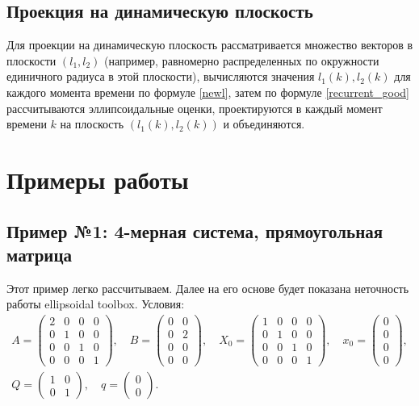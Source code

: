 \documentclass[10pt, a4paper]{article}
\begin{document}
\subsection{Проекция на динамическую плоскость}
Для проекции на динамическую плоскость рассматривается множество векторов в плоскости $(l_1,l_2)$ (например, равномерно распределенных по окружности единичного радиуса в этой плоскости), вычисляются значения $l_1(k), l_2(k)$ для каждого момента времени по формуле \eqref{newl}, затем по формуле \eqref{recurrent_good} рассчитываются эллипсоидальные оценки, проектируются в каждый момент времени $k$ на плоскость $(l_1(k),l_2(k))$ и объединяются.

\section{Примеры работы}
\subsection{Пример №1: 4-мерная система, прямоугольная матрица}
Этот пример легко рассчитываем. Далее на его основе будет показана неточность работы ellipsoidal toolbox.
Условия:
\begin{gather*} A = \left(\begin{array}{cccc} 2 & 0 & 0 & 0\\ 0 & 1 & 0 & 0\\ 0 & 0 & 1 & 0\\ 0 & 0 & 0 & 1 \end{array}\right),\quad 
B = \left(\begin{array}{cc} 0 & 0\\ 0 & 2\\ 0 & 0\\ 0 & 0 \end{array}\right),\quad 
X_0 = \left(\begin{array}{cccc} 1 & 0 & 0 & 0\\ 0 & 1 & 0 & 0\\ 0 & 0 & 1 & 0\\ 0 & 0 & 0 & 1 \end{array}\right),\quad 
x_0 = \left(\begin{array}{c} 0\\ 0\\ 0\\ 0 \end{array}\right), \\
Q = \left(\begin{array}{cc} 1 & 0\\ 0 & 1 \end{array}\right), \quad
q = \left(\begin{array}{c} 0\\ 0 \end{array}\right).
\end{gather*} 
\end{document}
